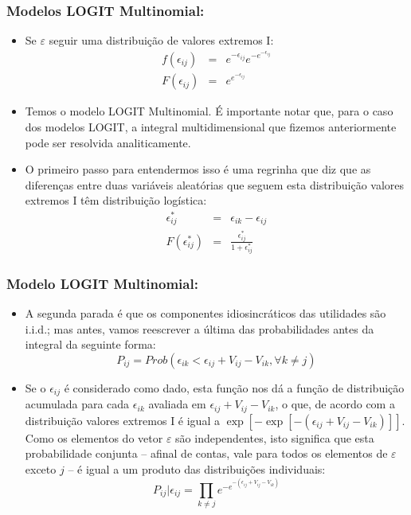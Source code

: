 \documentclass{beamer}
\begin{document}
\begin{frame}\frametitle{Modelos LOGIT Multinomial:}
\begin{itemize}
\item Se $\varepsilon$ seguir uma distribuição de valores extremos I:
\begin{eqnarray*}
f(\epsilon_{ij}) & = & e^{-\epsilon_{ij}}e^{-e^{-\epsilon_{ij}}}\\
F(\epsilon_{ij}) & = & e^{e^{-\epsilon_{ij}}}
\end{eqnarray*}
\item Temos o modelo LOGIT Multinomial. É importante notar que, para o caso
dos modelos LOGIT, a integral multidimensional que fizemos anteriormente
pode ser resolvida analiticamente.
\item O primeiro passo para entendermos isso é uma regrinha que diz que
as diferenças entre duas variáveis aleatórias que seguem esta distribuição
valores extremos I têm distribuição logística:
\begin{eqnarray*}
\epsilon_{ij}^{*} & = & \epsilon_{ik}-\epsilon_{ij}\\
F(\epsilon_{ij}^{*}) & = & \frac{\epsilon_{ij}^{*}}{1+\epsilon_{ij}^{*}}
\end{eqnarray*}
\end{itemize}
\end{frame}

\begin{frame}\frametitle{Modelo LOGIT Multinomial:}


\begin{itemize}
\item A segunda parada é que os componentes idiosincráticos das utilidades
são i.i.d.; mas antes, vamos reescrever a última das probabilidades
antes da integral da seguinte forma:
\[
P_{ij}=Prob(\epsilon_{ik}<\epsilon_{ij}+V_{ij}-V_{ik},\forall k\neq j)
\]
\item Se o $\epsilon_{ij}$ é considerado como dado, esta função nos dá
a função de distribuição acumulada para cada $\epsilon_{ik}$ avaliada
em $\epsilon_{ij}+V_{ij}-V_{ik}$, o que, de acordo com a distribuição
valores extremos I é igual a $\exp[-\exp[-(\epsilon_{ij}+V_{ij}-V_{ik})]]$.
Como os elementos do vetor $\varepsilon$ são independentes, isto
significa que esta probabilidade conjunta -- afinal de
contas, vale para todos os elementos de $\varepsilon$ exceto $j$
-- é igual a um produto das distribuições individuais:
\[
P_{ij}|\epsilon_{ij}=\prod_{k\neq j}e^{-e^{-(\epsilon_{ij}+V_{ij}-V_{ik})}}
\]
\end{itemize}
\end{frame}
\end{document}
